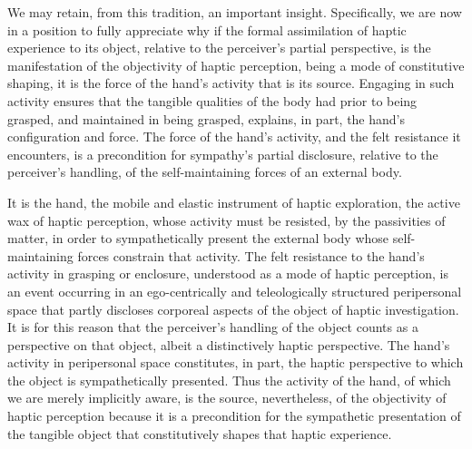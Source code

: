 We may retain, from this tradition, an important insight. Specifically, we are now in a position to fully appreciate why if the formal assimilation of haptic experience to its object, relative to the perceiver's partial perspective, is the manifestation of the objectivity of haptic perception, being a mode of constitutive shaping, it is the force of the hand's activity that is its source. Engaging in such activity ensures that the tangible qualities of the body had prior to being grasped, and maintained in being grasped, explains, in part, the hand’s configuration and force. The force of the hand's activity, and the felt resistance it encounters, is a precondition for sympathy's partial disclosure, relative to the perceiver's handling, of the self-maintaining forces of an external body.

It is the hand, the mobile and elastic instrument of haptic exploration, the active wax of haptic perception, whose activity must be resisted, by the passivities of matter, in order to sympathetically present the external body whose self-maintaining forces constrain that activity. The felt resistance to the hand's activity in grasping or enclosure, understood as a mode of haptic perception, is an event occurring in an ego-centrically and teleologically structured peripersonal space that partly discloses corporeal aspects of the object of haptic investigation. It is for this reason that the perceiver's handling of the object counts as a perspective on that object, albeit a distinctively haptic perspective. The hand's activity in peripersonal space constitutes, in part, the haptic perspective to which the object is sympathetically presented. Thus the activity of the hand, of which we are merely implicitly aware, is the source, nevertheless, of the objectivity of haptic perception because it is a precondition for the sympathetic presentation of the tangible object that constitutively shapes that haptic experience.



